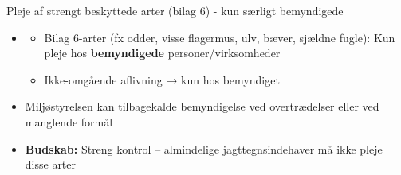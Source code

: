 \begin{frame}{Pleje af strengt beskyttede arter (bilag 6) - kun særligt bemyndigede}
\begin{itemize}
  \item 
  \begin{itemize}
    \item Bilag 6-arter (fx odder, visse flagermus, ulv, bæver, sjældne fugle): Kun pleje hos \textbf{bemyndigede} personer/virksomheder 
    \item Ikke-omgående aflivning → kun hos bemyndiget
  \end{itemize}
  \item Miljøstyrelsen kan tilbagekalde bemyndigelse ved overtrædelser eller ved manglende formål
  \item \textbf{Budskab:} Streng kontrol – almindelige jagttegnsindehaver må ikke pleje disse arter
\end{itemize}
\end{frame}

